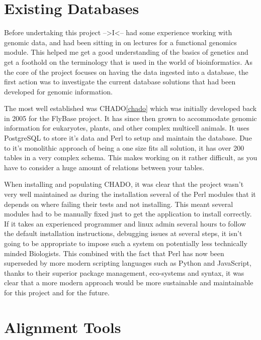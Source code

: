\section{Existing Databases}

Before undertaking this project -->I<-- had some experience working with genomic data, and had been sitting in on lectures for a functional genomics module. This helped me get a good understanding of the basics of genetics and get a foothold on the terminology that is used in the world of bioinformatics.  As the core of the project focuses on having the data ingested into a database, the first action was to investigate the current database solutions that had been developed for genomic information. 

The most well established was CHADO\ref{chado} which was initially developed back in 2005\cite{http://flybaselb1.uits.indiana.edu/reports/FBrf0206380.html} for the FlyBase\cite{flybase} project. It has since then grown to accommodate genomic information for eukaryotes, plants, and other complex multicell animals. It uses PostgreSQL\cite{postgres} to store it's data and Perl\cite{perl} to setup and maintain the database. Due to it's monolithic approach of being a one size fits all solution, it has over 200 tables in a very complex schema. This makes working on it rather difficult, as you have to consider a huge amount of relations between your tables. 

When installing and populating CHADO, it was clear that the project wasn't very well maintained as during the installation several of the Perl modules that it depends on where failing their tests and not installing. This meant several modules had to be manually fixed just to get the application to install correctly. If it takes an experienced programmer and linux admin several hours to follow the default installation instructions, debugging issues at several steps, it isn't going to be appropriate to impose such a system on potentially less technically minded Biologists. This combined with the fact that Perl has now been superseded by more modern scripting languages such as Python\cite{python} and JavaScript\cite{javascript}, thanks to their superior package management, eco-systems and syntax, it was clear that a more modern approach would be more sustainable and maintainable for this project and for the future. 

\section{Alignment Tools}

